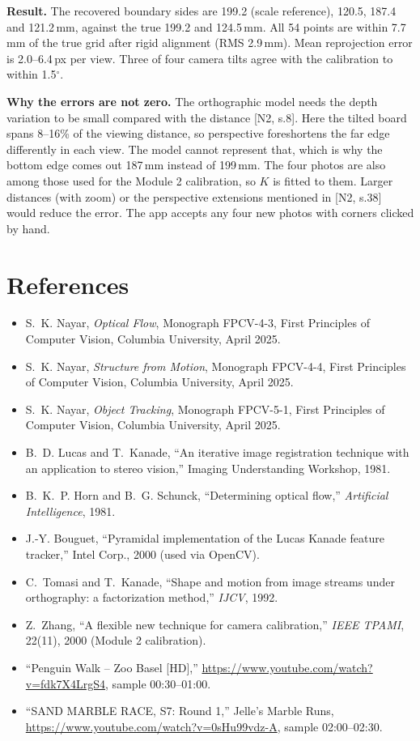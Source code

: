 \documentclass[10pt,letterpaper]{article}
\begin{document}
\textbf{Result.} The recovered boundary sides are 199.2 (scale reference), 120.5, 187.4 and
121.2\,mm, against the true 199.2 and 124.5\,mm. All 54 points are within 7.7\,mm of the true
grid after rigid alignment (RMS 2.9\,mm). Mean reprojection error is 2.0--6.4\,px per view.
Three of four camera tilts agree with the calibration to within 1.5$^\circ$.

\textbf{Why the errors are not zero.} The orthographic model needs the depth variation to be
small compared with the distance [N2, s.8]. Here the tilted board spans 8--16\% of the
viewing distance, so perspective foreshortens the far edge differently in each view. The
model cannot represent that, which is why the bottom edge comes out 187\,mm instead of
199\,mm. The four photos are also among those used for the Module 2 calibration, so $K$ is
fitted to them. Larger distances (with zoom) or the perspective extensions mentioned in
[N2, s.38] would reduce the error. The app accepts any four new photos with corners clicked
by hand.

\section*{References}
\small
\begin{itemize}\itemsep0pt
\item[{[N1]}] S.~K. Nayar, \emph{Optical Flow}, Monograph FPCV-4-3, First Principles of Computer Vision, Columbia University, April 2025.
\item[{[N2]}] S.~K. Nayar, \emph{Structure from Motion}, Monograph FPCV-4-4, First Principles of Computer Vision, Columbia University, April 2025.
\item[{[N3]}] S.~K. Nayar, \emph{Object Tracking}, Monograph FPCV-5-1, First Principles of Computer Vision, Columbia University, April 2025.
\item[] B.~D. Lucas and T.~Kanade, ``An iterative image registration technique with an application to stereo vision,'' Imaging Understanding Workshop, 1981.
\item[] B.~K.~P. Horn and B.~G. Schunck, ``Determining optical flow,'' \emph{Artificial Intelligence}, 1981.
\item[] J.-Y. Bouguet, ``Pyramidal implementation of the Lucas Kanade feature tracker,'' Intel Corp., 2000 (used via OpenCV).
\item[] C.~Tomasi and T.~Kanade, ``Shape and motion from image streams under orthography: a factorization method,'' \emph{IJCV}, 1992.
\item[] Z.~Zhang, ``A flexible new technique for camera calibration,'' \emph{IEEE TPAMI}, 22(11), 2000 (Module 2 calibration).
\item[{[V1]}] ``Penguin Walk -- Zoo Basel [HD],'' \url{https://www.youtube.com/watch?v=fdk7X4LrgS4}, sample 00:30--01:00.
\item[{[V2]}] ``SAND MARBLE RACE, S7: Round 1,'' Jelle's Marble Runs, \url{https://www.youtube.com/watch?v=0sHu99vdz-A}, sample 02:00--02:30.
\end{itemize}
\end{document}
